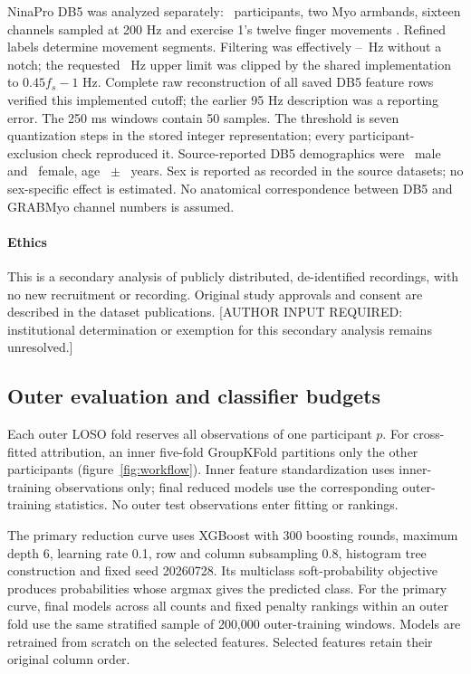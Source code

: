NinaPro DB5 was analyzed separately: \DBFiveSubjects\ participants, two Myo armbands, sixteen channels sampled at 200 Hz and exercise 1's twelve finger movements \citep{pizzolato2017comparison}. Refined labels determine movement segments. Filtering was effectively \RevDBFiveBandLow--\RevDBFiveBandHigh\ Hz without a notch; the requested \RevDBFiveBandRequestedHigh\ Hz upper limit was clipped by the shared implementation to $0.45f_s-1$ Hz. Complete raw reconstruction of all saved DB5 feature rows verified this implemented cutoff; the earlier 95 Hz description was a reporting error. The 250 ms windows contain 50 samples. The threshold is seven quantization steps in the stored integer representation; every participant-exclusion check reproduced it. Source-reported DB5 demographics were \DBFiveMale\ male and \DBFiveFemale\ female, age \DBFiveAgeMean\ $\pm$ \DBFiveAgeSD\ years. Sex is reported as recorded in the source datasets; no sex-specific effect is estimated. No anatomical correspondence between DB5 and GRABMyo channel numbers is assumed.

\paragraph{Ethics} This is a secondary analysis of publicly distributed, de-identified recordings, with no new recruitment or recording. Original study approvals and consent are described in the dataset publications. [AUTHOR INPUT REQUIRED: institutional determination or exemption for this secondary analysis remains unresolved.]

\subsection{Outer evaluation and classifier budgets}
Each outer LOSO fold reserves all observations of one participant $p$. For cross-fitted attribution, an inner five-fold GroupKFold partitions only the other participants (figure~\ref{fig:workflow}). Inner feature standardization uses inner-training observations only; final reduced models use the corresponding outer-training statistics. No outer test observations enter fitting or rankings.

The primary reduction curve uses XGBoost with 300 boosting rounds, maximum depth 6, learning rate 0.1, row and column subsampling 0.8, histogram tree construction and fixed seed 20260728. Its multiclass soft-probability objective produces probabilities whose argmax gives the predicted class. For the primary curve, final models across all counts and fixed penalty rankings within an outer fold use the same stratified sample of 200,000 outer-training windows. Models are retrained from scratch on the selected features. Selected features retain their original column order.

